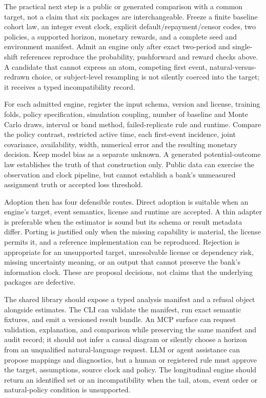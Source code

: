 The practical next step is a public or generated comparison with a common
target, not a claim that six packages are interchangeable. Freeze a finite
baseline cohort law, an integer event clock, explicit default/repayment/censor
codes, two policies, a supported horizon, monetary rewards, and a complete
seed and environment manifest. Admit an engine only after exact two-period and
single-shift references reproduce the probability, pushforward and reward
checks above. A candidate that cannot express an atom, competing first event,
natural-versus-redrawn choice, or subject-level resampling is not silently
coerced into the target; it receives a typed incompatibility record.

For each admitted engine, register the input schema, version and license,
training folds, policy specification, simulation coupling, number of baseline
and Monte Carlo draws, interval or band method, failed-replicate rule and
runtime. Compare the policy contrast, restricted active time, each first-event
incidence, joint covariance, availability, width, numerical error and the
resulting monetary decision. Keep model bias as a separate unknown. A generated
potential-outcome law establishes the truth of that construction only. Public
data can exercise the observation and clock pipeline, but cannot establish a
bank's unmeasured assignment truth or accepted loss threshold.

Adoption then has four defensible routes. Direct adoption is suitable when an
engine's target, event semantics, license and runtime are accepted. A thin
adapter is preferable when the estimator is sound but its schema or result
metadata differ. Porting is justified only when the missing capability is
material, the license permits it, and a reference implementation can be
reproduced. Rejection is appropriate for an unsupported target, unresolvable
license or dependency risk, missing uncertainty meaning, or an output that
cannot preserve the bank's information clock. These are proposal decisions,
not claims that the underlying packages are defective.

The shared library should expose a typed analysis manifest and a refusal
object alongside estimates. The CLI can validate the manifest, run exact
semantic fixtures, and emit a versioned result bundle. An MCP surface can
request validation, explanation, and comparison while preserving the same
manifest and audit record; it should not infer a causal diagram or silently
choose a horizon from an unqualified natural-language request. LLM or agent
assistance can propose mappings and diagnostics, but a human or registered
rule must approve the target, assumptions, source clock and policy. The
longitudinal engine should return an identified set or an incompatibility when
the tail, atom, event order or natural-policy condition is unsupported.

